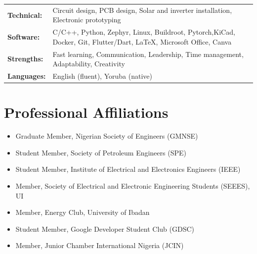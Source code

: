 \documentclass[10pt, a4paper]{article}
\begin{document}
\noindent
\begin{tabularx}{\linewidth}{@{} l X @{}}
  \textbf{Technical:} & Circuit design, PCB design, Solar and inverter installation, Electronic prototyping                                  \\[2pt]
  \textbf{Software:}  & C/C++, Python, Zephyr, Linux, Buildroot, Pytorch,KiCad, Docker, Git, Flutter/Dart, \LaTeX{}, Microsoft Office, Canva \\[2pt]
  \textbf{Strengths:} & Fast learning, Communication, Leadership, Time management, Adaptability, Creativity                                  \\[2pt]
  \textbf{Languages:} & English (fluent), Yoruba (native)                                                                                    \\
\end{tabularx}

\section{Professional Affiliations}

\begin{itemize}
  \item Graduate Member, Nigerian Society of Engineers (GMNSE)
  \item Student Member, Society of Petroleum Engineers (SPE)
  \item Student Member, Institute of Electrical and Electronics Engineers (IEEE)
  \item Member, Society of Electrical and Electronic Engineering Students (SEEES), UI
  \item Member, Energy Club, University of Ibadan
  \item Student Member, Google Developer Student Club (GDSC)
  \item Member, Junior Chamber International Nigeria (JCIN)
\end{itemize}
\end{document}

